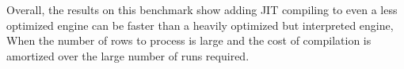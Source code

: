 Overall, the results on this benchmark show adding JIT compiling to even a less optimized engine can be faster than a heavily optimized but interpreted engine, When the number of rows to process is large and the cost of compilation is amortized over the large number of runs required.
